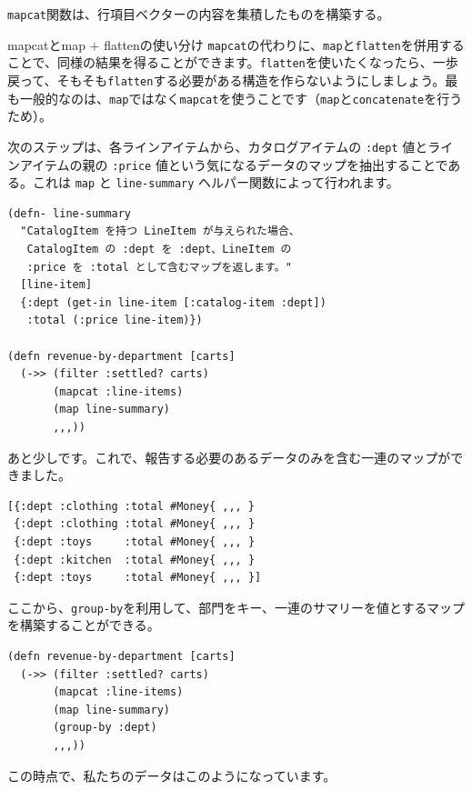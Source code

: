 \texttt{mapcat}関数は、行項目ベクターの内容を集積したものを構築する。

\begin{itembox}[l]{mapcatとmap + flattenの使い分け}
\texttt{mapcat}の代わりに、\texttt{map}と\texttt{flatten}を併用することで、同様の結果を得ることができます。\texttt{flatten}を使いたくなったら、一歩戻って、そもそも\texttt{flatten}する必要がある構造を作らないようにしましょう。最も一般的なのは、\texttt{map}ではなく\texttt{mapcat}を使うことです（\texttt{map}と\texttt{concatenate}を行うため）。
\end{itembox}

次のステップは、各ラインアイテムから、カタログアイテムの \texttt{:dept} 値とラインアイテムの親の \texttt{:price} 値という気になるデータのマップを抽出することである。これは \texttt{map} と \texttt{line-summary} ヘルパー関数によって行われます。



\begin{lstlisting}[numbers=none]
(defn- line-summary
  "CatalogItem を持つ LineItem が与えられた場合、
   CatalogItem の :dept を :dept、LineItem の 
   :price を :total として含むマップを返します。"
  [line-item]
  {:dept (get-in line-item [:catalog-item :dept])
   :total (:price line-item)})

(defn revenue-by-department [carts]
  (->> (filter :settled? carts)
       (mapcat :line-items)
       (map line-summary)
       ,,,))
\end{lstlisting}

あと少しです。これで、報告する必要のあるデータのみを含む一連のマップができました。


\begin{lstlisting}[numbers=none]
[{:dept :clothing :total #Money{ ,,, }
 {:dept :clothing :total #Money{ ,,, }
 {:dept :toys     :total #Money{ ,,, }
 {:dept :kitchen  :total #Money{ ,,, }
 {:dept :toys     :total #Money{ ,,, }]
\end{lstlisting}

ここから、\texttt{group-by}を利用して、部門をキー、一連のサマリーを値とするマップを構築することができる。


\begin{lstlisting}[numbers=none]
(defn revenue-by-department [carts]
  (->> (filter :settled? carts)
       (mapcat :line-items)
       (map line-summary)
       (group-by :dept)
       ,,,))
\end{lstlisting}

この時点で、私たちのデータはこのようになっています。


